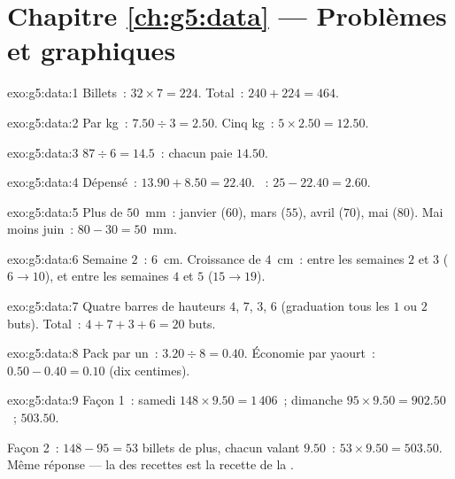 \section*{Chapitre \ref{ch:g5:data} --- Problèmes et graphiques}

\begin{solution}{exo:g5:data:1}
Billets~: $32 \times 7 = 224$. Total~: $240 + 224 = 464$.
\end{solution}

\begin{solution}{exo:g5:data:2}
Par kg~: $7.50 \div 3 = 2.50$. Cinq kg~:
$5 \times 2.50 = 12.50$.
\end{solution}

\begin{solution}{exo:g5:data:3}
$87 \div 6 = 14.5$~: chacun paie $14.50$.
\end{solution}

\begin{solution}{exo:g5:data:4}
Dépensé~: $13.90 + 8.50 = 22.40$. ~: $25 - 22.40 = 2.60$.
\end{solution}

\begin{solution}{exo:g5:data:5}
Plus de $50$~mm~: janvier ($60$), mars ($55$), avril ($70$), mai
($80$). Mai moins juin~: $80 - 30 = 50$~mm.
\end{solution}

\begin{solution}{exo:g5:data:6}
Semaine $2$~: $6$~cm. Croissance de $4$~cm~: entre les semaines $2$
et $3$ ($6 \to 10$), et entre les semaines $4$ et $5$
($15 \to 19$).
\end{solution}

\begin{solution}{exo:g5:data:7}
Quatre barres de hauteurs $4$, $7$, $3$, $6$ (graduation tous les
$1$ ou $2$ buts). Total~: $4 + 7 + 3 + 6 = 20$ buts.
\end{solution}

\begin{solution}{exo:g5:data:8}
Pack par un~: $3.20 \div 8 = 0.40$. Économie par yaourt~:
$0.50 - 0.40 = 0.10$ (dix centimes).
\end{solution}

\begin{solution}{exo:g5:data:9}
Façon 1~: samedi $148 \times 9.50 = 1\,406$~; dimanche
$95 \times 9.50 = 902.50$~;  $503.50$.

Façon 2~: $148 - 95 = 53$ billets de plus, chacun valant $9.50$~:
$53 \times 9.50 = 503.50$. Même réponse --- la  des
recettes est la recette de la .
\end{solution}

